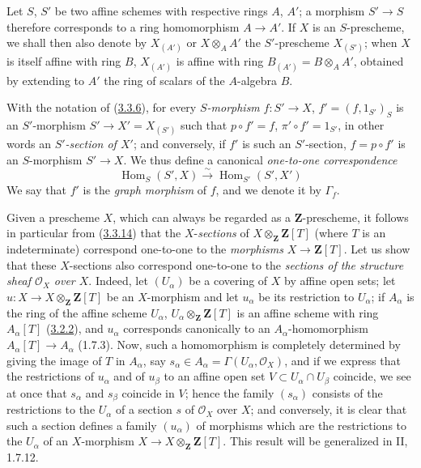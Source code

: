 \begin{env}[3.3.13]
\label{I.3.3.13}
Let $S$, $S'$ be two affine schemes with respective rings $A$, $A'$; a
morphism $S'\to S$ therefore corresponds to a ring homomorphism $A\to A'$.
If $X$ is an $S$-prescheme, we shall then also denote by $X_{(A')}$ or
$X\otimes_A A'$ the $S'$-prescheme $X_{(S')}$; when $X$ is itself
affine with ring $B$, $X_{(A')}$ is affine with ring
$B_{(A')}=B\otimes_A A'$, obtained by extending to $A'$ the ring of scalars
of the $A$-algebra $B$.
\end{env}

\begin{env}[3.3.14]
\label{I.3.3.14}
With the notation of (\hyperref[I.3.3.6]{3.3.6}), for every
\emph{$S$-morphism} $f:S'\to X$, $f'=(f,1_{S'})_S$ is an $S'$-morphism
$S'\to X'=X_{(S')}$ such that $p\circ f'=f$, $\pi'\circ f'=1_{S'}$, in other
words an \emph{$S'$-section of $X'$}; and conversely, if $f'$ is such an
$S'$-section, $f=p\circ f'$ is an $S$-morphism $S'\to X$. We thus define
a canonical \emph{one-to-one correspondence}
\label{I.3.3.14.correspondence}
\[
  \operatorname{Hom}_S(S',X)\overset{\sim}{\longrightarrow}
  \operatorname{Hom}_{S'}(S',X')
\]
We say that $f'$ is the \emph{graph morphism} of $f$, and we denote it by
$\Gamma_f$.
\end{env}

\begin{env}[3.3.15]
\label{I.3.3.15}
Given a prescheme $X$, which can always be regarded as a
$\mathbf{Z}$-prescheme, it follows in particular from
(\hyperref[I.3.3.14]{3.3.14}) that the $X$-\emph{sections} of
$X\otimes_{\mathbf{Z}}\mathbf{Z}[T]$ (where $T$ is an indeterminate)
correspond one-to-one to the \emph{morphisms}
$X\to\mathbf{Z}[T]$. Let us show that these $X$-sections also correspond
one-to-one to the \emph{sections of the structure sheaf
$\mathcal{O}_X$ over $X$}. Indeed, let $(U_\alpha)$ be a covering
of $X$ by affine open sets; let
$u:X\to X\otimes_{\mathbf{Z}}\mathbf{Z}[T]$ be an $X$-morphism and let
$u_\alpha$ be its restriction to $U_\alpha$; if $A_\alpha$ is the ring of the
affine scheme $U_\alpha$, $U_\alpha\otimes_{\mathbf{Z}}\mathbf{Z}[T]$ is an
affine scheme with ring $A_\alpha[T]$ (\hyperref[I.3.2.2]{3.2.2}), and
$u_\alpha$ corresponds canonically to an $A_\alpha$-homomorphism
$A_\alpha[T]\to A_\alpha$ (1.7.3). Now, such a homomorphism is completely
determined by giving the image of $T$ in $A_\alpha$, say
$s_\alpha\in A_\alpha=\Gamma(U_\alpha,\mathcal{O}_X)$, and if we express that
the restrictions of $u_\alpha$ and of $u_\beta$ to an affine open set
$V\subset U_\alpha\cap U_\beta$ coincide, we see at once that $s_\alpha$
and $s_\beta$ coincide in $V$; hence the family $(s_\alpha)$ consists of the
restrictions to the $U_\alpha$ of a section $s$ of $\mathcal{O}_X$ over
$X$; and conversely, it is clear that such a section defines a family
$(u_\alpha)$ of morphisms which are the restrictions to the $U_\alpha$ of an
$X$-morphism $X\to X\otimes_{\mathbf{Z}}\mathbf{Z}[T]$. This result will be
generalized in II, 1.7.12.
\end{env}

